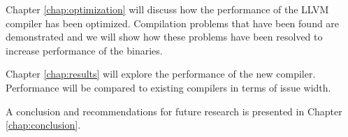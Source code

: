 Chapter \ref{chap:optimization} will discuss how the performance of the LLVM compiler has been optimized. Compilation problems that have been found are demonstrated and we will show how these problems have been resolved to increase performance of the binaries.

Chapter \ref{chap:results} will explore the performance of the new compiler. Performance will be compared to existing compilers in terms of issue width. 

A conclusion and recommendations for future research is presented in Chapter \ref{chap:conclusion}.  


\acresetall

